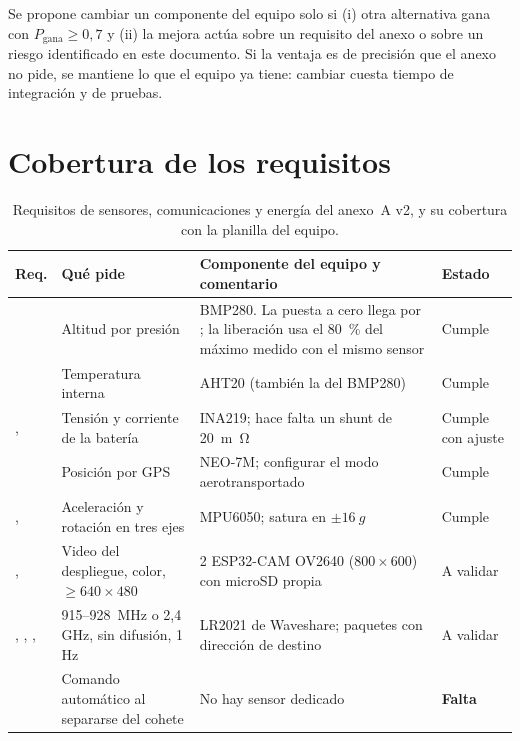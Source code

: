 \begin{nota}
Se propone cambiar un componente del equipo solo si (i) otra alternativa gana con
$P_{\text{gana}}\ge0{,}7$ y (ii) la mejora actúa sobre un requisito del anexo o sobre un
riesgo identificado en este documento. Si la ventaja es de precisión que el anexo no pide, se
mantiene lo que el equipo ya tiene: cambiar cuesta tiempo de integración y de pruebas.
\end{nota}

\section{Cobertura de los requisitos}\label{sec:sens-cobertura}

\begin{table}[H]
\centering\small
\caption{Requisitos de sensores, comunicaciones y energía del anexo~A v2, y su cobertura con la
planilla del equipo.}\label{tab:sens-cobertura}
\begin{tabularx}{\textwidth}{@{}p{1.6cm}YYp{2.0cm}@{}}
\toprule
\textbf{Req.} & \textbf{Qué pide} & \textbf{Componente del equipo y comentario} & \textbf{Estado}\\\midrule
{} & Altitud por presión & BMP280. La puesta a cero llega por ; la liberación usa el \SI{80}{\percent} del máximo medido con el mismo sensor & Cumple\\
 & Temperatura interna & AHT20 (también la del BMP280) & Cumple\\
,  & Tensión y corriente de la batería & INA219; hace falta un shunt de \SI{20}{m\ohm} & Cumple con ajuste\\
 & Posición por GPS & NEO-7M; configurar el modo aerotransportado & Cumple\\
,  & Aceleración y rotación en tres ejes & MPU6050; satura en $\pm\SI{16}{g}$ & Cumple\\
,  & Video del despliegue, color, $\ge640\times480$ & 2 ESP32-CAM OV2640 ($800\times600$) con microSD propia & A validar\\
, , ,  & 915--\SI{928}{MHz} o 2,4\,GHz, sin difusión, 1\,Hz & LR2021 de Waveshare; paquetes con dirección de destino & A validar\\
 & Comando automático al separarse del cohete & No hay sensor dedicado & \textbf{Falta}\\

\end{tabularx}
\end{table}
